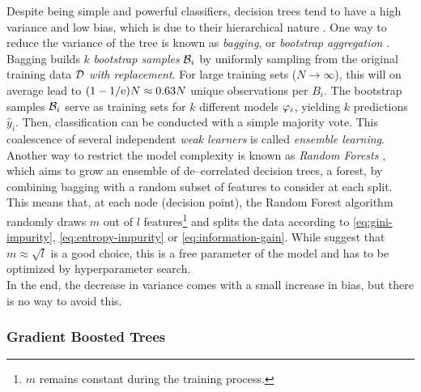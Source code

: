 Despite being simple and powerful classifiers, decision trees tend to have a high variance and low bias, which is due to their hierarchical nature \citep{richards2011}. One way to reduce the variance of the tree is known as \emph{bagging}, or \emph{bootstrap aggregation} \citep{breiman1996}. Bagging builds $k$ \emph{bootstrap samples} $\mathcal{B}_i$ by uniformly sampling from the original training data $\mathcal{D}$ \emph{with replacement}. For large training sets ($N \to \infty$), this will on average lead to $(1 - 1/\mathrm{e}) N \approx 0.63 N$ unique observations per $B_i$. The bootstrap samples $\mathcal{B}_i$ serve as training sets for $k$ different models $\varphi_i$, yielding $k$ predictions $\hat y_i$. Then, classification can be conducted with a simple majority vote. This coalescence of several independent \emph{weak learners} is called \emph{ensemble learning}. Another way to restrict the model complexity is known as \emph{Random Forests} \citep{breiman2001}, which aims to grow an ensemble of de--correlated decision trees, a forest, by combining bagging with a random subset of features to consider at each split. This means that, at each node (decision point), the Random Forest algorithm randomly draws $m$ out of $l$ features\footnote{$m$ remains constant during the training process.} and splits the data according to \eqref{eq:gini-impurity}, \eqref{eq:entropy-impurity} or \eqref{eq:information-gain}. While \citeauthor{breiman2001} suggest that $m \approx \sqrt{l}$ is a good choice, this is a free parameter of the model and has to be optimized by hyperparameter search.\\


In the end, the decrease in variance comes with a small increase in bias, but there is no way to avoid this.





\subsubsection{Gradient Boosted Trees}


%